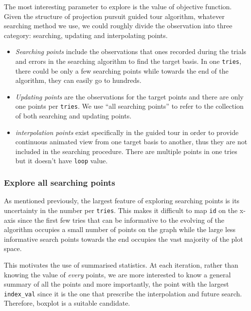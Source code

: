 \documentclass[12pt]{article}
\begin{document}
The most interesting parameter to explore is the value of objective
function. Given the structure of projection pursuit guided tour
algorithm, whatever searching method we use, we could roughly divide the
observation into three category: searching, updating and interpolating
points.

\begin{itemize}
\item
  \emph{Searching points} include the observations that ones recorded
  during the trials and errors in the searching algorithm to find the
  target basis. In one \texttt{tries}, there could be only a few
  searching points while towards the end of the algorithm, they can
  easily go to hundreds.
\item
  \emph{Updating points} are the observations for the target points and
  there are only one points per \texttt{tries}. We use ``all searching
  points'' to refer to the collection of both searching and updating
  points.
\item
  \emph{interpolation points} exist specifically in the guided tour in
  order to provide continuous animated view from one target basis to
  another, thus they are not included in the searching procedure. There
  are multiple points in one tries but it doesn't have \texttt{loop}
  value.
\end{itemize}

\hypertarget{explore-all-searching-points}{%
\subsubsection{Explore all searching
points}\label{explore-all-searching-points}}

As mentioned previously, the largest feature of exploring searching
points is its uncertainty in the number per \texttt{tries}. This makes
it difficult to map \texttt{id} on the x-axis since the first few tries
that can be informative to the evolving of the algorithm occupies a
small number of points on the graph while the large less informative
search points towards the end occupies the vast majority of the plot
space.

This motivates the use of summarised statistics. At each iteration,
rather than knowing the value of \emph{every} points, we are more
interested to know a general summary of all the points and more
importantly, the point with the largest \texttt{index\_val} since it is
the one that prescribe the interpolation and future search. Therefore,
boxplot is a suitable candidate.
\end{document}
